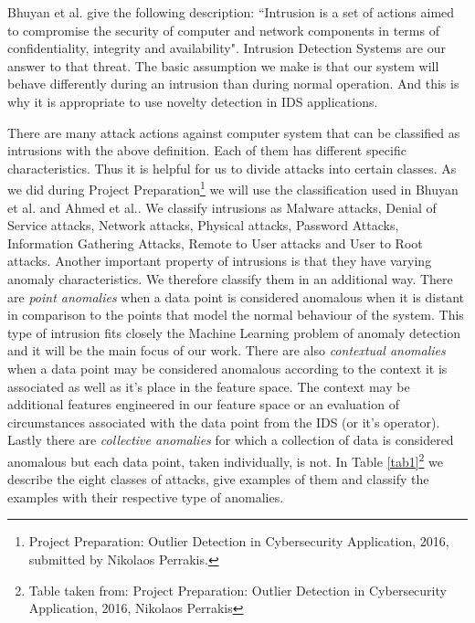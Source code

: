 \documentclass[reqno,openany,12pt]{amsbook}
\begin{document}
Bhuyan et al.\cite{ids1} give the following description: ``Intrusion is a set of actions aimed to compromise the security of computer and network components in terms of confidentiality, integrity and availability". Intrusion Detection Systems are our answer to that threat. The basic assumption we make is that our system will behave differently during an intrusion than during normal operation. And this is why it is appropriate to use novelty detection in IDS applications.

There are many attack actions against computer system that can be classified as intrusions with the above definition. Each of them has different specific characteristics. Thus it is helpful for us to divide attacks into certain classes. As we did during Project Preparation\footnote{Project Preparation: Outlier Detection in Cybersecurity Application, 2016, submitted by Nikolaos Perrakis.} we will use the classification used in Bhuyan et al.\cite{ids1} and Ahmed et al.\cite{ids2}. We classify intrusions as Malware attacks, Denial of Service attacks, Network attacks, Physical attacks, Password Attacks, Information Gathering Attacks, Remote to User attacks and User to Root attacks.
Another important property of intrusions is that they have varying anomaly characteristics. We therefore classify them in an additional way. There are \emph{point anomalies} when a data point is considered anomalous when it is distant in comparison to the points that model the normal behaviour of the system. This type of intrusion fits closely the Machine Learning problem of anomaly detection and it will be the main focus of our work. There are also \emph{contextual anomalies} when a data point may be considered anomalous according to the context it is associated as well as it's place in the feature space. The context may be additional features engineered in our feature space or an evaluation of circumstances associated with the data point from the IDS (or it's operator). Lastly there are \emph{collective anomalies} for which a collection of data is considered anomalous but each data point, taken individually, is not. In Table \ref{tab1}\footnote{Table taken from: Project Preparation: Outlier Detection in Cybersecurity Application, 2016, Nikolaos Perrakis} we describe the eight classes of attacks, give examples of them and classify the examples with their respective type of anomalies.
\end{document}
